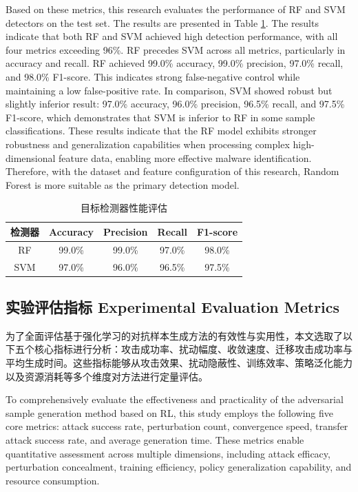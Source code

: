 Based on these metrics, this research evaluates the performance of RF and SVM detectors on the test set. The results are presented in Table \ref{tab:5.4}. The results indicate that both RF and SVM achieved high detection performance, with all four metrics exceeding 96\%. RF precedes SVM across all metrics, particularly in accuracy and recall. RF achieved 99.0\% accuracy, 99.0\% precision, 97.0\% recall, and 98.0\% F1-score. This indicates strong false-negative control while maintaining a low false-positive rate. In comparison, SVM showed robust but slightly inferior result: 97.0\% accuracy, 96.0\% precision, 96.5\% recall, and 97.5\% F1-score, which demonstrates that SVM is inferior to RF in some sample classifications. These results indicate that the RF model exhibits stronger robustness and generalization capabilities when processing complex high-dimensional feature data, enabling more effective malware identification. Therefore, with the dataset and feature configuration of this research, Random Forest is more suitable as the primary detection model.

\begin{table}[htbp]
	\centering
	\caption{目标检测器性能评估}
	\label{tab:5.4}
	\renewcommand{\arraystretch}{1.3}
	\begin{tabular*}{0.9\textwidth}{@{\extracolsep{\fill}}ccccc}
		\toprule
		检测器 & Accuracy & Precision & Recall & F1-score \\
		\midrule
		RF  & 99.0\% & 99.0\% & 97.0\% & 98.0\% \\
		SVM & 97.0\% & 96.0\% & 96.5\% & 97.5\% \\
		\bottomrule
	\end{tabular*}
\end{table}

\subsection{实验评估指标 Experimental Evaluation Metrics}

为了全面评估基于强化学习的对抗样本生成方法的有效性与实用性，本文选取了以下五个核心指标进行分析：攻击成功率、扰动幅度、收敛速度、迁移攻击成功率与平均生成时间。这些指标能够从攻击效果、扰动隐蔽性、训练效率、策略泛化能力以及资源消耗等多个维度对方法进行定量评估。

To comprehensively evaluate the effectiveness and practicality of the adversarial sample generation method based on RL, this study employs the following five core metrics: attack success rate, perturbation count, convergence speed, transfer attack success rate, and average generation time. These metrics enable quantitative assessment across multiple dimensions, including attack efficacy, perturbation concealment, training efficiency, policy generalization capability, and resource consumption.

